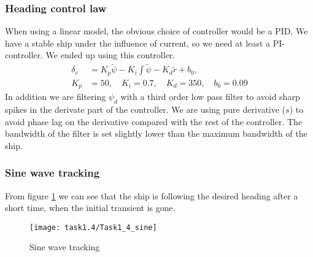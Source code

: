 \subsubsection*{Heading control law}
When using a linear model, the obvious choice of controller would be a PID. We have a stable ship under the influence of current, so we need at least a PI-controller. We ended up using this controller.
\begin{equation}
\begin{split}
    \delta_c &= K_p \tilde{\psi} - K_i \int \tilde{\psi} - K_d \tilde{r} + b_0,\\
    K_p &= 50,\quad K_i=0.7,\quad K_d=350,\quad b_0=0.09
\end{split}
\end{equation}
In addition we are filtering $\psi_d$ with a third order low pass filter to avoid sharp spikes in the derivate part of the controller. We are using pure derivative ($s$) to avoid phase lag on the derivative compared with the rest of the controller. The bandwidth of the filter is set slightly lower than the maximum bandwidth of the ship.

\subsubsection*{Sine wave tracking}
From figure \ref{fig:1.4-sine} we can see that the ship is following the desired heading after a short time, when the initial transient is gone. 
\begin{figure}[H]
    \centering
    \texttt{[image: task1.4/Task1\_4\_sine]}
    \caption{Sine wave tracking}
    \label{fig:1.4-sine}
\end{figure}